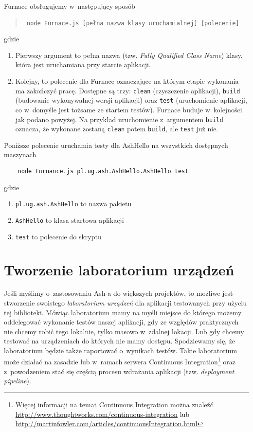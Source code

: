 \documentclass[brudnopis]{xmgr}
\begin{document}
Furnace obsługujemy w~następujący sposób

\begin{quote}
	\texttt{ node Furnace.js [pełna nazwa klasy uruchamialnej] [polecenie] }
\end{quote}

gdzie

\begin{enumerate}
  \item Pierwszy argument to pełna nazwa (tzw. \textit{Fully Qualified Class Name}) klasy, która jest uruchamiana przy starcie aplikacji. 
  \item Kolejny, to polecenie dla Furnace oznaczające na którym etapie wykonania ma zakończyć pracę. Dostępne są trzy: \texttt{clean} (czyszczenie aplikacji), \texttt{build} (budowanie wykonywalnej wersji aplikacji) oraz \texttt{test} (uruchomienie aplikacji, co w~domyśle jest tożsame ze startem testów). Furnace buduje w~kolejności jak podano powyżej. Na przykład uruchomienie z~argumentem \texttt{build} oznacza, że wykonane zostaną \texttt{clean} potem \texttt{build}, ale \texttt{test} już nie.
\end{enumerate}

Poniższe polecenie uruchamia testy dla AshHello na wszystkich dostępnych maszynach 

\begin{lstlisting}
	node Furnance.js pl.ug.ash.AshHello.AshHello test
\end{lstlisting}

gdzie

\begin{enumerate}
  \item \texttt{pl.ug.ash.AshHello} to nazwa pakietu
  \item \texttt{AshHello} to klasa startowa aplikacji
  \item \texttt{test} to polecenie do skryptu 
\end{enumerate}

\section{Tworzenie laboratorium urządzeń}

Jeśli myślimy o~zastosowaniu Ash-a do większych projektów, to możliwe jest stworzenie swoistego \textit{laboratorium urządzeń} dla aplikacji testowanych przy użyciu tej biblioteki. Mówiąc laboratorium mamy na myśli miejsce do którego możemy oddelegować wykonanie testów naszej aplikacji, gdy ze względów praktycznych nie chcemy robić tego lokalnie, tylko masowo w~zdalnej lokacji. Lub gdy chcemy testować na urządzeniach do których nie mamy dostępu. Spodziewamy się, że laboratorium będzie także raportować o~wynikach testów. Takie laboratorium może działać na zasadzie lub w~ramach serwera Continuous Integration\footnote{ Więcej informacji na temat Continuous Integration można znaleźć \url{http://www.thoughtworks.com/continuous-integration} lub \url{http://martinfowler.com/articles/continuousIntegration.html} } oraz z~powodzeniem stać się częścią procesu wdrażania aplikacji (tzw. \textit{deployment pipeline}).
\end{document}
